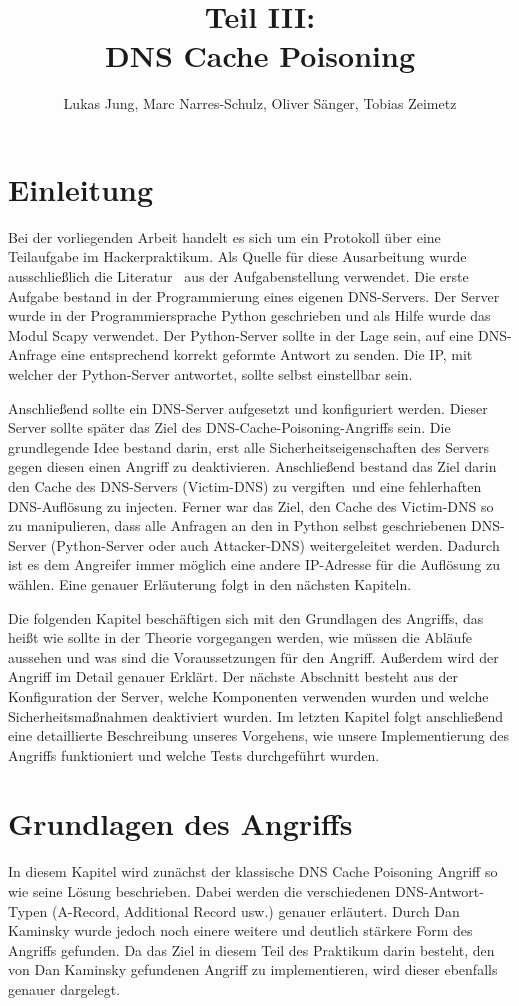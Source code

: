 \documentclass[10pt,a4paper]{article}
\author{Lukas Jung, Marc Narres-Schulz, Oliver Sänger, Tobias Zeimetz}
\title{Teil III: \\DNS Cache Poisoning}
\begin{document}
\maketitle
\newpage

\section{Einleitung}
Bei der vorliegenden Arbeit handelt es sich um ein Protokoll über eine Teilaufgabe im \glqq Hackerpraktikum\grqq. Als Quelle für diese Ausarbeitung wurde ausschließlich die Literatur~\cite{Blog} aus der Aufgabenstellung verwendet. Die erste Aufgabe bestand in der Programmierung eines eigenen DNS-Servers. Der Server wurde in der Programmiersprache Python geschrieben und als Hilfe wurde das Modul Scapy verwendet. Der Python-Server sollte in der Lage sein, auf eine DNS-Anfrage eine entsprechend korrekt geformte Antwort zu senden. Die IP, mit welcher der Python-Server antwortet, sollte selbst einstellbar sein.

Anschließend sollte ein DNS-Server aufgesetzt und konfiguriert werden. Dieser Server sollte später das Ziel des DNS-Cache-Poisoning-Angriffs sein. Die grundlegende Idee bestand darin, erst alle Sicherheitseigenschaften des Servers gegen diesen einen Angriff zu deaktivieren. Anschließend bestand das Ziel darin den Cache des DNS-Servers (Victim-DNS) zu \glqq vergiften\grqq \ und eine fehlerhaften DNS-Auflösung zu injecten. Ferner war das Ziel, den Cache des Victim-DNS so zu manipulieren, dass alle Anfragen an den in Python selbst geschriebenen DNS-Server (Python-Server oder auch Attacker-DNS) weitergeleitet werden. Dadurch ist es dem Angreifer immer möglich eine andere IP-Adresse für die Auflösung zu wählen. Eine genauer Erläuterung folgt in den nächsten Kapiteln.

Die folgenden Kapitel beschäftigen sich mit den Grundlagen des Angriffs, das heißt wie sollte in der Theorie vorgegangen werden, wie müssen die Abläufe aussehen und was sind die Voraussetzungen für den Angriff. Außerdem wird der Angriff im Detail genauer Erklärt. Der nächste Abschnitt besteht aus der Konfiguration der Server, welche Komponenten verwenden wurden und welche Sicherheitsmaßnahmen deaktiviert wurden. Im letzten Kapitel folgt anschließend eine detaillierte Beschreibung unseres Vorgehens, wie unsere Implementierung des Angriffs funktioniert und welche Tests durchgeführt wurden.

\section{Grundlagen des Angriffs}
In diesem Kapitel wird zunächst der klassische DNS Cache Poisoning Angriff so wie seine Lösung beschrieben. Dabei werden die verschiedenen DNS-Antwort-Typen (A-Record, Additional Record usw.) genauer erläutert. Durch Dan Kaminsky wurde jedoch noch einere weitere und deutlich stärkere Form des Angriffs gefunden. Da das Ziel in diesem Teil des Praktikum darin besteht, den von Dan Kaminsky gefundenen Angriff zu implementieren, wird dieser ebenfalls genauer dargelegt.
\end{document}
